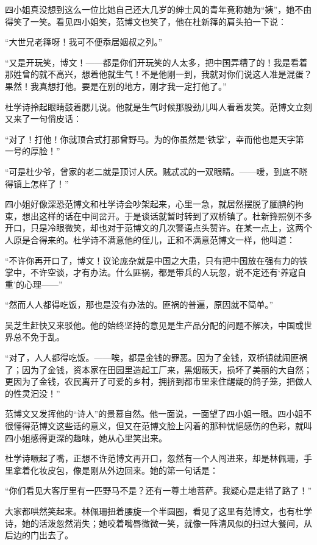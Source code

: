 \par 四小姐真没想到这么一位比她自己还大几岁的绅士风的青年竟称她为“姨”，她不由得笑了一笑。看见四小姐笑，范博文也笑了，他在杜新箨的肩头拍一下说：
\par “大世兄老箨呀！我可不便忝居姻叔之列。”
\par “又是开玩笑，博文！——都是你们开玩笑的人太多，把中国弄糟了的！我是看着那姓曾的就不高兴，想着他就生气！不是他刚一到，我就对你们说这人准是混蛋？果然！我真想打他。要是在别的地方，刚才我一定打他了。”
\par 杜学诗拎起眼睛鼓着腮儿说。他就是生气时候那股劲儿叫人看着发笑。范博文立刻又来了一句俏皮话：
\par “对了！打他！你就顶合式打那曾野马。为的你虽然是‘铁掌’，幸而他也是天字第一号的厚脸！”
\par “可是杜少爷，曾家的老二就是顶讨人厌。贼忒忒的一双眼睛。——嗳，到底不晓得镇上怎样了！”
\par 四小姐好像深恐范博文和杜学诗会吵架起来，心里一急，就居然摆脱了腼腆的拘束，想出这样的话在中间岔开。于是谈话就暂时转到了双桥镇了。杜新箨照例不多开口，只是冷眼微笑，却也对于范博文的几次警语点头赞许。在某一点上，这两个人原是合得来的。杜学诗不满意他的侄儿，正和不满意范博文一样，他叫道：
\par “不许你再开口了，博文！议论庞杂就是中国之大患，只有把中国放在强有力的铁掌中，不许空谈，才有办法。什么匪祸，都是带兵的人玩忽，说不定还有‘养寇自重’的心理——”
\par “然而人人都得吃饭，那也是没有办法的。匪祸的普遍，原因就不简单。”
\par 吴芝生赶快又来驳他。他的始终坚持的意见是生产品分配的问题不解决，中国或世界总不免于乱。
\par “对了，人人都得吃饭。——唉，都是金钱的罪恶。因为了金钱，双桥镇就闹匪祸了；因为了金钱，资本家在田园里造起工厂来，黑烟蔽天，损坏了美丽的大自然；更因为了金钱，农民离开了可爱的乡村，拥挤到都市里来住龌龊的鸽子笼，把做人的性灵汩没！”
\par 范博文又发挥他的“诗人”的景慕自然。他一面说，一面望了四小姐一眼。四小姐不很懂得范博文这些话的意义，但又在范博文脸上闪着的那种忧悒感伤的色彩，就叫四小姐感得更深的趣味，她从心里笑出来。
\par 杜学诗噘起了嘴，正想不许范博文再开口，忽然有一个人闯进来，却是林佩珊，手里拿着化妆皮包，像是刚从外边回来。她的第一句话是：
\par “你们看见大客厅里有一匹野马不是？还有一尊土地菩萨。我疑心是走错了路了！”
\par 大家都哄然笑起来。林佩珊扭着腰旋一个半圆圈，看见了这里有范博文，也有杜学诗，她的活泼忽然消失；她咬着嘴唇微微一笑，就像一阵清风似的扫过大餐间，从后边的门出去了。
